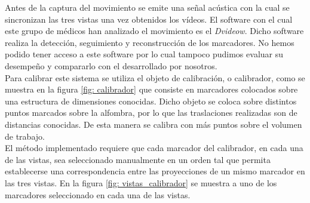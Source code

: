 Antes de la captura del movimiento se emite una señal acústica con la cual se sincronizan las tres vistas una vez obtenidos los vídeos. El software con el cual este grupo de médicos han analizado el movimiento es el \textit{Dvideow}.            
 Dicho software realiza la detección, seguimiento y reconstrucción de los marcadores. No hemos podido tener acceso a este software por lo cual tampoco pudimos evaluar su desempeño y compararlo con el desarrollado por nosotros.\\

Para calibrar este sistema se utiliza el objeto de calibración, o calibrador, como se muestra en la figura \ref{fig: calibrador} que consiste en marcadores colocados sobre una estructura de dimensiones conocidas. Dicho objeto se coloca sobre distintos puntos marcados sobre la alfombra, por lo que las traslaciones realizadas son de distancias conocidas. De esta manera se calibra con más puntos sobre el volumen de trabajo.\\


El método implementado requiere que cada marcador del calibrador, en cada una de las vistas, sea seleccionado manualmente en un orden tal que permita establecerse una correspondencia entre las proyecciones de un mismo marcador en las tres vistas. En la figura \ref{fig: vistas_calibrador} se muestra a uno de los marcadores seleccionado en cada una de las vistas.\\


